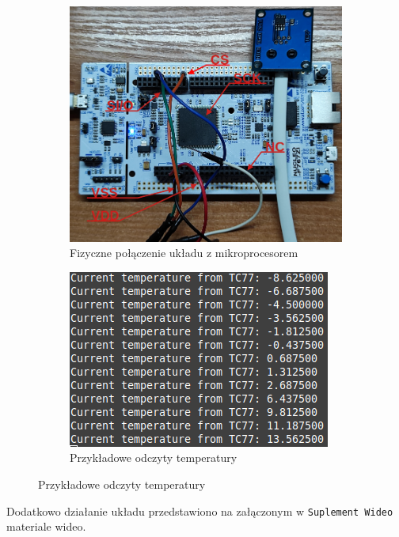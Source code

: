 \documentclass[11pt, a4paper]{article}
\begin{document}
\vspace{0.25cm}
\begin{figure}[h]
\centering
\begin{subfigure}{.5\textwidth}
\centering
\includegraphics[width=1\linewidth]{fig/TC77/polaczenie_modulu/board.png}
\caption{Fizyczne połączenie układu z mikroprocesorem}
\label{fig:_board}
\end{subfigure}%
\begin{subfigure}{.5\textwidth}
\centering
\includegraphics[width=0.9\linewidth]{fig/TC77/polaczenie_modulu/uart.png}
\caption{Przykładowe odczyty temperatury}
\label{fig:_uart}
\end{subfigure}
\label{fig:mikroproc}
\end{figure}
\vspace{0.25cm}
Dodatkowo działanie układu przedstawiono na załączonym w \texttt{Suplement Wideo} materiale 
wideo.

\newpage
\printbibliography[heading=bibintoc]
\end{document}
